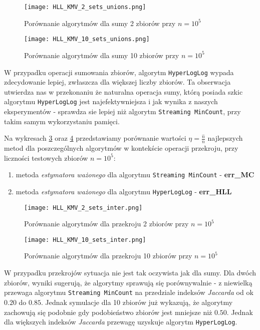 \begin{figure}[h!]
	\texttt{[image: HLL\_KMV\_2\_sets\_unions.png]}
	\centering
	\caption{Porównanie algorytmów dla sumy 2 zbiorów przy $n=10^5$}
	\label{fig:HLL_KMV_2_sets_unions}
\end{figure}

\begin{figure}[h!]
	\texttt{[image: HLL\_KMV\_10\_sets\_unions.png]}
	\centering
	\caption{Porównanie algorytmów dla sumy 10 zbiorów przy $n=10^5$}
	\label{fig:HLL_KMV_10_sets_unions}
\end{figure}
W przypadku operacji sumowania zbiorów, algorytm \texttt{HyperLogLog} wypada zdecydowanie lepiej, zwłaszcza dla większej liczby zbiorów. Ta obserwacja utwierdza nas w przekonaniu że naturalna operacja sumy, którą posiada szkic algorytmu \texttt{HyperLogLog} jest najefektywniejsza i jak wynika z naszych eksperymentów - sprawdza sie lepiej niż algorytm \texttt{Streaming MinCount}, przy takim samym wykorzystaniu pamięci.

Na wykresach \ref{fig:HLL_KMV_2_sets_inter} oraz \ref{fig:HLL_KMV_10_sets_inter} przedstawiamy porównanie wartości $\eta = \frac{\hat{n}}{n}$ najlepszych metod dla poszczególnych algorytmów w kontekście operacji przekroju, przy liczności testowych zbiorów $n=10^5$:
\begin{enumerate}
	\item metoda \textit{estymatora ważonego} dla algorytmu \texttt{Streaming MinCount} - \textbf{err\_MC}
	\item metoda \textit{estymatora ważonego} dla algorytmu \texttt{HyperLogLog} - \textbf{err\_HLL}
\end{enumerate}

\begin{figure}[h!]
	\texttt{[image: HLL\_KMV\_2\_sets\_inter.png]}
	\centering
	\caption{Porównanie algorytmów dla przekroju 2 zbiorów przy $n=10^5$}
	\label{fig:HLL_KMV_2_sets_inter}
\end{figure}

\begin{figure}[h!]
	\texttt{[image: HLL\_KMV\_10\_sets\_inter.png]}
	\centering
	\caption{Porównanie algorytmów dla przekroju 10 zbiorów przy $n=10^5$}
	\label{fig:HLL_KMV_10_sets_inter}
\end{figure}

W przypadku przekrojów sytuacja nie jest tak oczywista jak dla sumy. Dla dwóch zbiorów, wyniki sugerują, że algorytmy sprawują się porównywalnie - z niewielką przewaga algorytmu \texttt{Streaming MinCount} na przedziale indeksów \textit{Jaccarda} od ok $0.20$ do $0.85$. Jednak symulacje dla 10 zbiorów już wykazują, że algorytmy zachowują się podobnie gdy podobieństwo zbiorów jest mniejsze niż $0.50$. Jednak dla większych indeksów \textit{Jaccarda} przewagę uzyskuje algorytm \texttt{HyperLogLog}.

